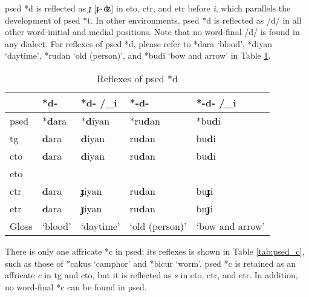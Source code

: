 \acl{psed} *d is reflected as \textit{ɟ} [ɟ\~{ }ʥ] in \acl{eto}, \acl{ctr}, and \acl{etr} before \textit{i}, which parallels the development of \acl{psed} *t. In other environments, \acl{psed} *d is reflected as /d/ in all other word-initial and medial positions. Note that no word-final /d/ is found in any dialect. For reflexes of \acl{psed} *d, please refer to *dara `blood', *diyan `daytime', *rudan `old (person)', and *budi `bow and arrow' in Table \ref{tab:psed_d}. 

\begin{table}[!htbp]
\centering
\caption{Reflexes of \acl{psed} *d}
\label{tab:psed_d}
\begin{tabular}{lllll}
\hline
           & *d-     & *d- /\_i  & *-d-           & *-d- /\_i       \\ \hline
\acs{psed} & *\textbf{d}ara   & *\textbf{d}iyan    & *ru\textbf{d}an         & *bu\textbf{d}i           \\ \hdashline
\acs{tg}   & \textbf{d}ara    & \textbf{d}iyan     & ru\textbf{d}an          & bu\textbf{d}i            \\
\acs{cto}  & \textbf{d}ara    & \textbf{d}iyan     & ru\textbf{d}an          & bu\textbf{d}i            \\
\acs{eto}  &         &           &                &                 \\
\acs{ctr}  & \textbf{d}ara    & \textbf{ɟ}iyan     & ru\textbf{d}an          & bu\textbf{ɟ}i            \\
\acs{etr}  & \textbf{d}ara    & \textbf{ɟ}iyan     & ru\textbf{d}an          & bu\textbf{ɟ}i            \\ \hline
Gloss      & `blood' & `daytime' & `old (person)' & `bow and arrow' \\ \hline
\end{tabular}
\end{table}

There is only one affricate *c in \acl{psed}; its reflexes is shown in Table \ref{tab:psed_c}, such as those of *cakus `camphor' and *bicur `worm'. \acl{psed} *c is retained as an affricate \textit{c} in \acl{tg} and \acl{cto}, but it is reflected as \textit{s} in \acl{eto}, \acl{ctr}, and \acl{etr}. In addition, no word-final *c can be found in \acl{psed}.

